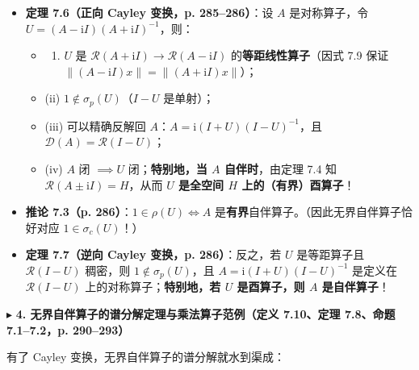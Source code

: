 \documentclass[11pt,a4paper]{article}
\providecommand{\tightlist}{\setlength{\itemsep}{2pt}\setlength{\parskip}{0pt}}
\newcommand{\SubSubHeading}[1]{%
  \Needspace{6.5\baselineskip}\vspace{5.5pt}\noindent
  \textcolor{AccentMain}{\scriptsize$\blacktriangleright$}\hspace{4pt}%
  {\small\bfseries\color{AccentMain}#1}\par\nopagebreak[4]\vspace{2.5pt}%
}
\begin{document}
\begin{itemize}
\tightlist
\item
  \textbf{定理 7.6（正向 Cayley 变换，p. 285--286）}：设 \(A\) 是对称算子，令 \(U = (A - \mathrm{i}I)(A + \mathrm{i}I)^{-1}\)，则：

  \begin{itemize}
  \tightlist
  \item
    \begin{enumerate}
    \def\labelenumi{(\roman{enumi})}
    \tightlist
    \item
      \(U\) 是 \(\mathcal{R}(A+\mathrm{i}I) \to \mathcal{R}(A-\mathrm{i}I)\) 的\textbf{等距线性算子}（因式 7.9 保证 \(\|(A-\mathrm{i}I)x\| = \|(A+\mathrm{i}I)x\|\)）；
    \end{enumerate}
  \item
    (ii) \textbf{\(1 \notin \sigma_p(U)\)}（\(I - U\) 是单射）；
  \item
    (iii) 可以精确反解回 \(A\)：\textbf{\(A = \mathrm{i}(I+U)(I-U)^{-1}\)}，且 \(\mathcal{D}(A) = \mathcal{R}(I - U)\)；
  \item
    (iv) \(A\) 闭 \(\implies U\) 闭；\textbf{特别地，当 \(A\) 自伴时}，由定理 7.4 知 \(\mathcal{R}(A\pm\mathrm{i}I) = H\)，从而 \textbf{\(U\) 是全空间 \(H\) 上的（有界）酉算子}！
  \end{itemize}
\item
  \textbf{推论 7.3（p. 286）}：\(1 \in \rho(U) \iff A\) 是\textbf{有界}自伴算子。（因此无界自伴算子恰好对应 \(1 \in \sigma_c(U)\)！）
\item
  \textbf{定理 7.7（逆向 Cayley 变换，p. 286）}：反之，若 \(U\) 是等距算子且 \(\mathcal{R}(I-U)\) 稠密，则 \(1 \notin \sigma_p(U)\)，且 \(A = \mathrm{i}(I+U)(I-U)^{-1}\) 是定义在 \(\mathcal{R}(I-U)\) 上的对称算子；\textbf{特别地，若 \(U\) 是酉算子，则 \(A\) 是自伴算子}！
\end{itemize}

\SubSubHeading{4. 无界自伴算子的谱分解定理与乘法算子范例（定义 7.10、定理 7.8、命题 7.1--7.2，p. 290--293）}

有了 Cayley 变换，无界自伴算子的谱分解就水到渠成：
\end{document}

